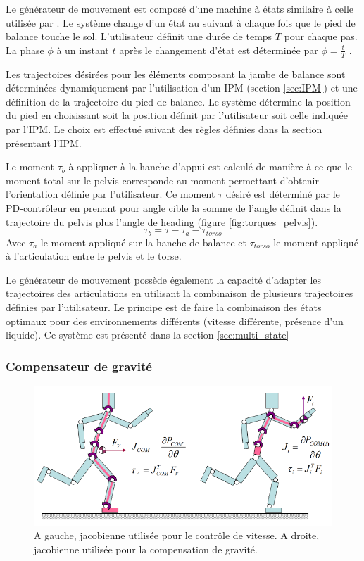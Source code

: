 \documentclass{llncs}
\begin{document}
Le générateur de mouvement est composé d'une machine à états similaire à celle utilisée par \cite{yin2007simbicon}. Le système change d'un état au suivant à chaque fois que le pied de balance touche le sol. L'utilisateur définit une durée de temps \(T \) pour chaque pas. La phase \(\phi \) à un instant \(t \) après le changement d'état est déterminée par \(\phi=\frac{t}{T}\) .

Les trajectoires désirées pour les éléments composant la jambe de balance sont déterminées dynamiquement par l'utilisation d'un IPM (section \ref{sec:IPM}) et une définition de la trajectoire du pied de balance. Le système détermine la position du pied en choisissant soit la position définit par l'utilisateur soit celle indiquée par l'IPM. Le choix est effectué suivant des règles définies dans la section présentant l'IPM.

Le moment \(\tau_b \) à appliquer à la hanche d'appui est calculé de manière à ce que le moment total sur le pelvis corresponde au moment permettant d'obtenir l'orientation définie par l'utilisateur. Ce moment \(\tau \) désiré est déterminé par le PD-contrôleur en prenant pour angle cible la somme de l'angle définit dans la trajectoire du pelvis plus l'angle de heading (figure \ref{fig:torques_pelvis}).
\[
\tau_b=\tau - \tau_a - \tau_{torso}
\]
Avec \(\tau_a \) le moment appliqué sur la hanche de balance et \(\tau_{torso} \) le moment appliqué à l'articulation entre le pelvis et le torse.

Le générateur de mouvement possède également la capacité d'adapter les trajectoires des articulations en utilisant la combinaison de plusieurs trajectoires définies par l'utilisateur. Le principe est de faire la combinaison des états optimaux pour des environnements différents (vitesse différente, présence d'un liquide). Ce système est présenté dans la section \ref{sec:multi_state}

\subsubsection{Compensateur de gravité}
\label{sec:jacob}
\begin{figure}[h]
\centering
\includegraphics[scale=0.5]{shema_jacobians.png}
\caption{A gauche, jacobienne utilisée pour le contrôle de vitesse. A droite, jacobienne utilisée pour la compensation de gravité. \cite{coros2010generalized} }
\label{fig:jacob}
\end{figure}
\end{document}

